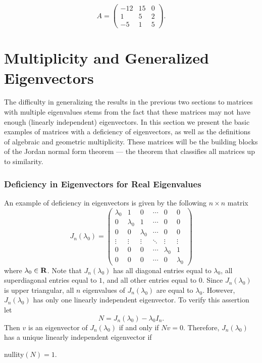 \begin{exercise} \label{c10.4.7d}
\begin{equation*}
A = \left(\begin{array}{rrr}
   -12 &    15 &     0\\
     1 &     5 &     2\\
    -5 &     1 &     5
\end{array}\right).
\end{equation*}
\end{exercise}



\section{Multiplicity and Generalized Eigenvectors}  \label{S:MGE}

The difficulty in generalizing the results in the previous two sections to
matrices with multiple eigenvalues stems from the fact that these matrices 
may not have enough (linearly independent) eigenvectors.  In this section we 
present the basic examples of matrices with a deficiency of eigenvectors, as
well as the definitions of algebraic and geometric multiplicity.  These 
matrices will be the building blocks of the Jordan normal form theorem --- 
the theorem that classifies all matrices up to similarity.

\subsubsection*{Deficiency in Eigenvectors for Real Eigenvalues}

An example of deficiency in eigenvectors is given by the following 
$n\times n$ matrix
\begin{equation}  \label{E:JnR}
J_n(\lambda_0)=\left(\begin{array}{cccccc} \lambda_0 & 1 & 0 & \cdots & 0 & 0\\
	0 & \lambda_0 & 1 & \cdots & 0 & 0 \\
	0 & 0 & \lambda_0  & \cdots & 0 & 0\\
	\vdots & \vdots & \vdots & \ddots & \vdots & \vdots\\
	0 & 0 & 0 & \cdots & \lambda_0 & 1 \\
	0 & 0 & 0 & \cdots & 0 & \lambda_0 \end{array}\right)
\end{equation}
where $\lambda_0\in\mbox{$\bf{R}$}$.  Note that $J_n(\lambda_0)$ has all diagonal 
entries equal to $\lambda_0$,
all superdiagonal entries equal to $1$, and all other entries equal 
to $0$. Since $J_n(\lambda_0)$ is upper triangular, all $n$ 
eigenvalues of $J_n(\lambda_0)$ are equal to $\lambda_0$.  However,
$J_n(\lambda_0)$ has only one linearly independent eigenvector.  To 
verify this assertion let 
\[
N = J_n(\lambda_0) - \lambda_0I_n.
\]
Then $v$ is an eigenvector of $J_n(\lambda_0)$ if and only if $Nv=0$.
Therefore, $J_n(\lambda_0)$ has a unique linearly independent 
eigenvector  if 
\begin{lemma}
{\rm nullity}$(N)=1$.
\end{lemma}

